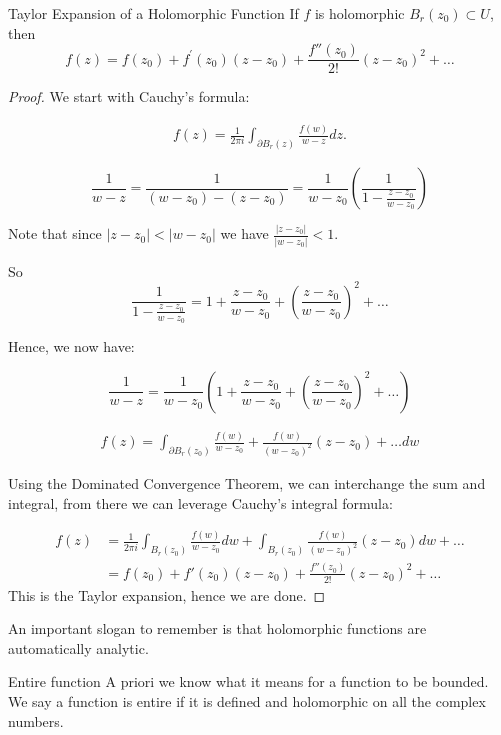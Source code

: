 \documentclass{article}
\begin{document}
\begin{thrm}{Taylor Expansion of a Holomorphic Function}{}
If \( f \) is holomorphic \( B_r(z_0) \subset U \), then 
\[
    f(z) = f(z_0) + f^\prime (z_0)(z - z_0)+ \frac{f''(z_0)}{2!}(z - z_0)^{2} +\dots 
\]
\tcbline
\begin{proof}
We start with Cauchy's formula:

\begin{align*}
    f(z) = \frac{1}{2\pi i} \int _{\partial B_r(z)} \frac{f(w)}{w - z} dz.
\end{align*}


\[
    \frac{1}{w - z} = \frac{1}{(w - z_0) - (z - z_0)} = \frac{1}{w - z_0} \left( \frac{1}{1 - \frac{z - z_{0} }{w - z_0} } \right)    
\]
 
Note that since \( |z - z_0| < |w - z_0| \) we have \( \frac{|z - z_0|}{|w - z_0|} < 1 \).

So
\[
    \frac{1}{1 -\frac{z - z_0}{w - z_0} } = 1 + \frac{z - z_0}{w - z_0} + \left( \frac{z - z_0}{w - z_0} \right)^{2} + \dots  
\]

Hence, we now have:

\[
    \frac{1}{w - z} = \frac{1}{w - z_0}\left( 1 + \frac{z - z_0}{w - z_0} + \left( \frac{z - z_0}{w - z_0} \right)^{2} + \dots   \right)  
\]

\begin{align*}
    f(z) = \int _{\partial B_r(z_0)} \frac{f(w)}{w - z_0} + \frac{f(w)}{(w - z_0)^{2} }(z - z _0) + \dots   dw
\end{align*}

Using the Dominated Convergence Theorem, we can interchange the sum and integral, from there we can leverage Cauchy's integral formula:

\begin{align*}
    f(z) &= \frac{1}{2\pi i}\int _{B_r(z_0)}\frac{f(w)}{w - z_0}dw + \int _{B_r(z_0)}\frac{f(w)}{(w - z_0)^{2} }(z - z_0) dw+\dots \\
    &= f(z_0) + f'(z_0)(z - z_0)+ \frac{f''(z_0)}{2!}(z - z_0)^{2} +\dots 
\end{align*}
This is the Taylor expansion, hence we are done. 
\end{proof}


\end{thrm}
An important slogan to remember is that holomorphic functions are automatically analytic.

\begin{defn}{Entire function}{}
A priori we know what it means for a function to be bounded. We say a function is entire if it is defined and holomorphic on all the complex numbers. 
\end{defn}
\end{document}
